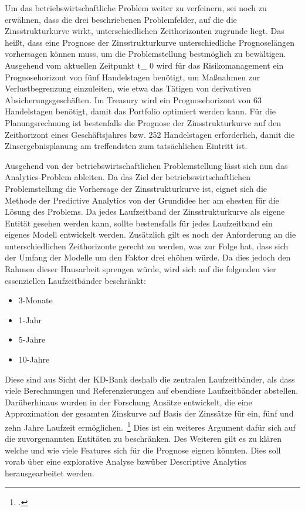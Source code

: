 
Um das betriebswirtschaftliche Problem weiter zu verfeinern, sei noch zu erwähnen, dass die drei beschriebenen Problemfelder,
auf die die Zinsstrukturkurve wirkt, unterschiedlichen Zeithorizonten zugrunde liegt.
Das heißt, dass eine Prognose der Zinsstrukturkurve unterschiedliche Prognoselängen vorhersagen können muss, um die
Problemstellung bestmöglich zu bewältigen.
Ausgehend vom aktuellen Zeitpunkt t_{ 0 } wird für das Risikomanagement ein Prognosehorizont von fünf Handelstagen benötigt, um
Maßnahmen zur Verlustbegrenzung einzuleiten, wie etwa das Tätigen von derivativen Absicherungsgeschäften.
Im Treasury wird ein Prognosehorizont von 63 Handelstagen benötigt, damit das Portfolio optimiert werden kann.
Für die Planungsrechnung ist bestenfalls die Prognose der Zinsstrukturkurve auf den Zeithorizont eines Geschäftsjahres bzw.
252 Handelstagen erforderlich, damit die Zinsergebnisplanung am treffendsten zum tatsächlichen Eintritt ist.
\newline

Ausgehend von der betriebswirtschaftlichen Problemstellung lässt sich nun das Analytics-Problem ableiten.
Da das Ziel der betriebswirtschaftlichen Problemstellung die Vorhersage der Zinsstrukturkurve ist, eignet sich die
Methode der Predictive Analytics von der Grundidee her am ehesten für die Lösung des Problems.
Da jedes Laufzeitband der Zinsstrukturkurve als eigene Entität gesehen werden kann, sollte bestensfalls für jedes
Laufzeitband ein eigenes Modell entwickelt werden.
Zusätzlich gilt es noch der Anforderung an die unterschiedlichen Zeithorizonte gerecht zu werden, was zur Folge hat,
dass sich der Umfang der Modelle um den Faktor drei ehöhen würde.
Da dies jedoch den Rahmen dieser Hausarbeit sprengen würde, wird sich auf die folgenden vier essenziellen Laufzeitbänder
beschränkt:
\begin{itemize}
    \item 3-Monate
    \item 1-Jahr
    \item 5-Jahre
    \item 10-Jahre
\end{itemize}
Diese sind aus Sicht der \ac{KD-Bank} deshalb die zentralen Laufzeitbänder, als dass viele Berechnungen und Referenzierungen
auf ebendiese Laufzeitbänder abstellen.
Darüberhinaus wurden in der Forschung Ansätze entwickelt, die eine Approximation der gesamten Zinskurve auf Basis der
Zinssätze für ein, fünf und zehn Jahre Laufzeit ermöglichen.~\footcite[\vglf][\pagef]{}
Dies ist ein weiteres Argument dafür sich auf die zuvorgenannten Entitäten zu beschränken.
\newline
Des Weiteren gilt es zu klären welche und wie viele Features sich für die Prognose eignen könnten.
Dies soll vorab über eine explorative Analyse bzw\. über Descriptive Analytics herausgearbeitet werden.

